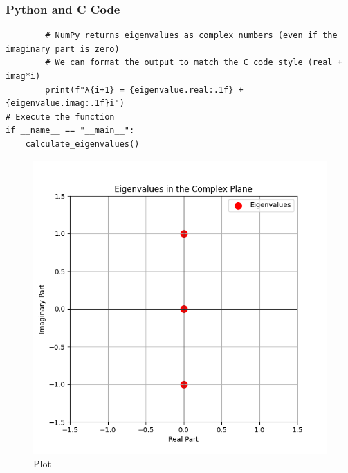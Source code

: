 \documentclass{beamer}
\begin{document}
\begin{frame}[fragile]
\frametitle{Python and C Code}
\begin{lstlisting}
        # NumPy returns eigenvalues as complex numbers (even if the imaginary part is zero)
        # We can format the output to match the C code style (real + imag*i)
        print(f"λ{i+1} = {eigenvalue.real:.1f} + {eigenvalue.imag:.1f}i")
# Execute the function
if __name__ == "__main__":
    calculate_eigenvalues()
\end{lstlisting}
\end{frame}

\begin{frame}
\begin{figure}[H]
    \centering
    \includegraphics[width=0.75\columnwidth]{graph-20.png}
    \caption{Plot}
    \label{fig:placeholder}
\end{figure}
\end{frame}
\end{document}
